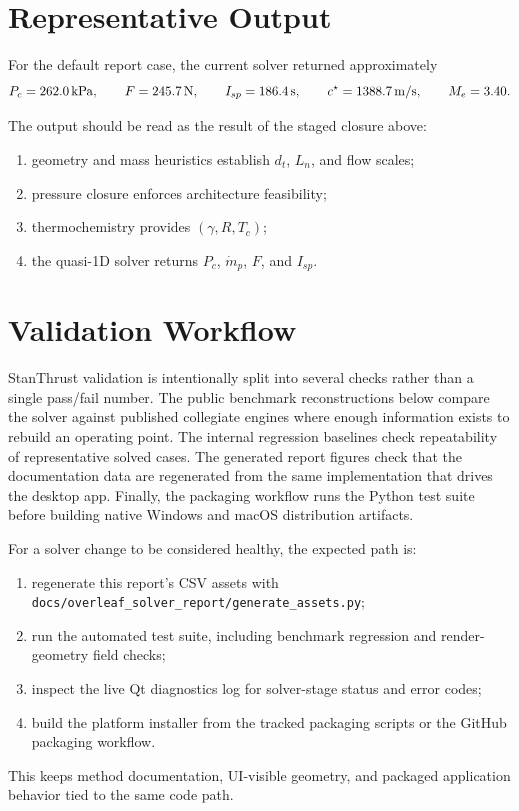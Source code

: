 \documentclass[11pt]{article}
\newcommand{\mdotp}{\dot{m}_{p}}
\begin{document}
\section{Representative Output}
For the default report case, the current solver returned approximately
\[
P_c=\SI{262.0}{kPa}, \qquad
F=\SI{245.7}{N}, \qquad
I_{sp}=\SI{186.4}{s}, \qquad
c^\star=\SI{1388.7}{m/s}, \qquad
M_e=3.40.
\]

The output should be read as the result of the staged closure above:
\begin{enumerate}[leftmargin=6mm]
\item geometry and mass heuristics establish $d_t$, $L_n$, and flow scales;
\item pressure closure enforces architecture feasibility;
\item thermochemistry provides $(\gamma,R,T_c)$;
\item the quasi-1D solver returns $P_c$, $\mdotp$, $F$, and $I_{sp}$.
\end{enumerate}

\section{Validation Workflow}
StanThrust validation is intentionally split into several checks rather than a single pass/fail number. The public benchmark reconstructions below compare the solver against published collegiate engines where enough information exists to rebuild an operating point. The internal regression baselines check repeatability of representative solved cases. The generated report figures check that the documentation data are regenerated from the same implementation that drives the desktop app. Finally, the packaging workflow runs the Python test suite before building native Windows and macOS distribution artifacts.

For a solver change to be considered healthy, the expected path is:
\begin{enumerate}[leftmargin=6mm]
\item regenerate this report's CSV assets with \texttt{docs/overleaf\_solver\_report/generate\_assets.py};
\item run the automated test suite, including benchmark regression and render-geometry field checks;
\item inspect the live Qt diagnostics log for solver-stage status and error codes;
\item build the platform installer from the tracked packaging scripts or the GitHub packaging workflow.
\end{enumerate}
This keeps method documentation, UI-visible geometry, and packaged application behavior tied to the same code path.
\end{document}

